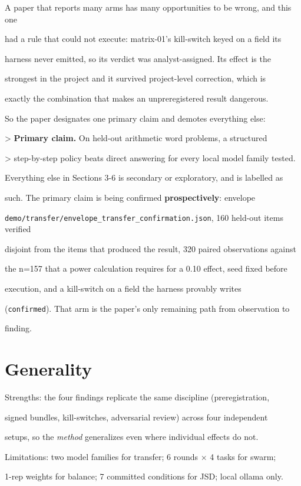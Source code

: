 \documentclass[11pt]{article}
\begin{document}
A paper that reports many arms has many opportunities to be wrong, and this one

had a rule that could not execute: matrix-01's kill-switch keyed on a field its

harness never emitted, so its verdict was analyst-assigned. Its effect is the

strongest in the project and it survived project-level correction, which is

exactly the combination that makes an unpreregistered result dangerous.


So the paper designates one primary claim and demotes everything else:


> {\bf Primary claim.} On held-out arithmetic word problems, a structured

> step-by-step policy beats direct answering for every local model family tested.


Everything else in Sections 3-6 is secondary or exploratory, and is labelled as

such. The primary claim is being confirmed {\bf prospectively}: envelope

\texttt{demo/transfer/envelope\_transfer\_confirmation.json}, 160 held-out items verified

disjoint from the items that produced the result, 320 paired observations against

the n=157 that a power calculation requires for a 0.10 effect, seed fixed before

execution, and a kill-switch on a field the harness provably writes

(\texttt{confirmed}). That arm is the paper's only remaining path from observation to

finding.


\section*{Generality}

Strengths: the four findings replicate the same discipline (preregistration,

signed bundles, kill-switches, adversarial review) across four independent

setups, so the {\it method} generalizes even where individual effects do not.

Limitations: two model families for transfer; 6 rounds $\times$ 4 tasks for swarm;

1-rep weights for balance; 7 committed conditions for JSD; local ollama only.
\end{document}
